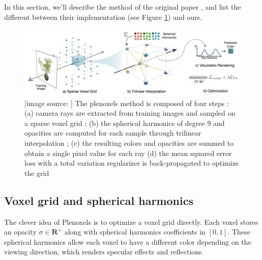 \documentclass{article}
\begin{document}
In this section, we'll describe the method of the original paper \cite{plenoxels}, and list the different between their implementation (see Figure \ref{fig:plenoxel}) and ours.



\begin{figure}[!h]
\centering
\includegraphics[width=1.\textwidth]{figs/plen_pipeline.png}
\caption{\label{fig:plenoxel} [image source: \cite{plenoxels}] The plenoxels method is composed of four steps : (a) camera rays are extracted from training images and sampled on a sparse voxel grid ; (b) the spherical harmonics of degree 9 and opacities are computed for each sample through trilinear interpolation ; (c) the resulting colors and opacities are summed to obtain a single pixel value for each ray (d) the mean squared error loss with a total variation regularizer is back-propagated to optimize the grid}
\end{figure}



\subsection{Voxel grid and spherical harmonics}

The clever idea of Plenoxels is to optimize a voxel grid directly. Each voxel stores an opacity $\sigma \in \mathbf{R}^+$ along with spherical harmonics coefficients in $[0,1]$. These spherical harmonics allow each voxel to have a different color depending on the viewing direction, which renders specular effects and reflections.
\end{document}
